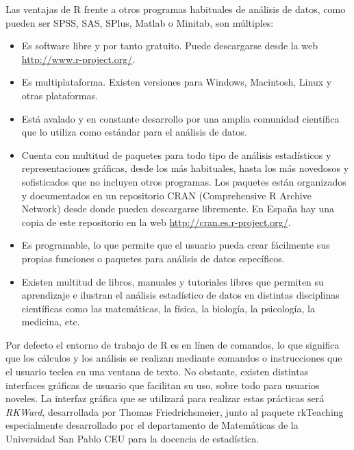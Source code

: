 Las ventajas de R frente a otros programas habituales de análisis de datos, como pueden ser SPSS, SAS, SPlus, Matlab o
Minitab, son múltiples:
\begin{itemize}
\item Es software libre y por tanto gratuito. Puede descargarse desde la web 
\url{http://www.r-project.org/}.
\item Es multiplataforma. Existen versiones para Windows, Macintosh, Linux y otras plataformas.
\item Está avalado y en constante desarrollo por una amplia comunidad científica que lo utiliza como estándar para el
análisis de datos.
\item Cuenta con multitud de paquetes para todo tipo de análisis estadísticos y representaciones gráficas, desde los más
habituales, hasta los más novedosos y sofisticados que no incluyen otros programas. Los paquetes están organizados y
documentados en un repositorio CRAN (Comprehensive R Archive Network) desde donde pueden descargarse libremente. En
España hay una copia de este repositorio en la web \url{http://cran.es.r-project.org/}.
\item Es programable, lo que permite que el usuario pueda crear fácilmente sus propias funciones o paquetes para
análisis de datos específicos.
\item Existen multitud de libros, manuales y tutoriales libres que permiten su aprendizaje e ilustran el análisis
estadístico de datos en distintas disciplinas científicas como las matemáticas, la física, la biología, la psicología, la medicina,
etc.
\end{itemize}

Por defecto el entorno de trabajo de R es en línea de comandos, lo que significa que los cálculos y los análisis se realizan mediante comandos o instrucciones que el usuario teclea en una ventana de texto. No obstante, existen distintas
interfaces gráficas de usuario que facilitan su uso, sobre todo para usuarios noveles.
La interfaz gráfica que se utilizará para realizar estas prácticas será \emph{RKWard}, desarrollada por Thomas Friedrichsmeier, junto al paquete rkTeaching especialmente desarrollado por el departamento de Matemáticas de la Universidad San Pablo CEU para la docencia de estadística.

